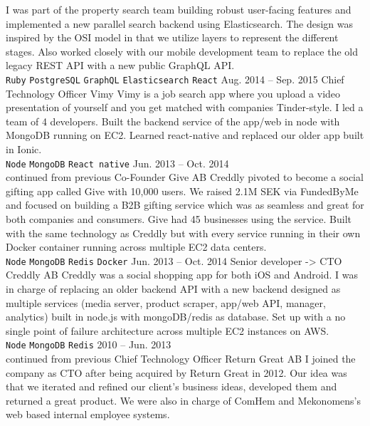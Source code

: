 \documentclass[9pt]{template} %
\begin{document}
\begin{entrylist}
{      I was part of the property search team building robust user-facing features and implemented a new parallel search backend using Elasticsearch. The design was inspired by the OSI model in that we utilize layers to represent the different stages. Also worked closely with our mobile development team to replace the old legacy REST API with a new public GraphQL API.\\
      \texttt{Ruby}\slashsep
      \texttt{PostgreSQL}\slashsep
      \texttt{GraphQL}\slashsep
      \texttt{Elasticsearch}\slashsep
      \texttt{React}
    }
  \entry
    {Aug. 2014 -- Sep. 2015}
    {Chief Technology Officer}
    {Vimy}
    {Vimy is a job search app where you upload a video presentation of yourself and you get matched with companies Tinder-style. I led a team of 4 developers. Built the backend service of the app/web in node with MongoDB running on EC2. Learned react-native and replaced our older app built in Ionic.\\
      \texttt{Node}\slashsep
      \texttt{MongoDB}\slashsep
      \texttt{React native}
    }
  \entry
    {Jun. 2013 – Oct. 2014\\\footnotesize{continued from previous}}
    {Co-Founder}
    {Give AB}
    {Creddly pivoted to become a social gifting app called Give with 10,000 users. We raised 2.1M SEK via FundedByMe and focused on building a B2B gifting service which was as seamless and great for both companies and consumers. Give had 45 businesses using the service. Built with the same technology as Creddly but with every service running in their own Docker container running across multiple EC2 data centers.\\
      \texttt{Node}\slashsep
      \texttt{MongoDB}\slashsep
      \texttt{Redis}\slashsep
      \texttt{Docker}
    }
  \entry
    {Jun. 2013 -- Oct. 2014}
    {Senior developer -> CTO}
    {Creddly AB}
    {Creddly was a social shopping app for both iOS and Android. I was in charge of replacing an older backend API with a new backend designed as multiple services (media server, product scraper, app/web API, manager, analytics) built in node.js with mongoDB/redis as database. Set up with a no single point of failure architecture across multiple EC2 instances on AWS.\\
      \texttt{Node}\slashsep
      \texttt{MongoDB}\slashsep
      \texttt{Redis}
    }
  \entry
    {2010 -- Jun. 2013\\\footnotesize{continued from previous}}
    {Chief Technology Officer}
    {Return Great AB}
    {I joined the company as CTO after being acquired by Return Great in 2012. Our idea was that we iterated and refined our client's business ideas, developed them and returned a great product. We were also in charge of ComHem and Mekonomens’s web based internal employee systems.\\
}
\end{entrylist}
\end{document}

